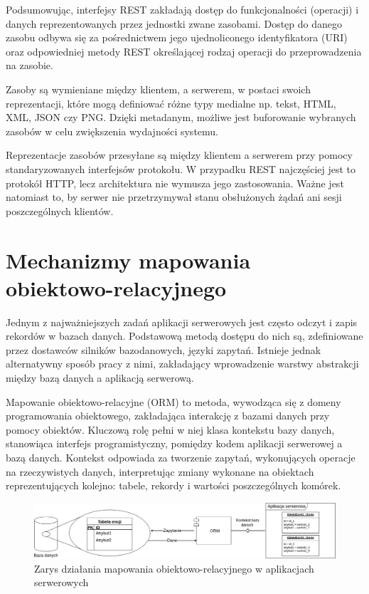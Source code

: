 Podsumowując, interfejsy REST zakładają dostęp do funkcjonalności (operacji) i danych reprezentowanych przez jednostki zwane zasobami. Dostęp do danego zasobu odbywa się za pośrednictwem jego  ujednoliconego identyfikatora (URI) oraz odpowiedniej metody REST określającej rodzaj operacji do przeprowadzenia na zasobie.

Zasoby są wymieniane między klientem, a serwerem, w postaci swoich reprezentacji, które mogą definiować różne typy medialne np. tekst, HTML, XML, JSON czy PNG. Dzięki metadanym, możliwe jest buforowanie wybranych zasobów w celu zwiększenia wydajności systemu.

Reprezentacje zasobów przesyłane są między klientem a serwerem przy pomocy standaryzowanych interfejsów protokołu. W przypadku REST najczęściej jest to protokół HTTP, lecz architektura nie wymusza jego zastosowania. Ważne jest natomiast to, by serwer nie przetrzymywał stanu obsłużonych żądań ani sesji poszczególnych klientów.

\section{Mechanizmy mapowania obiektowo-relacyjnego}

Jednym z najważniejszych zadań aplikacji serwerowych jest często odczyt i zapis rekordów w bazach danych. Podstawową metodą dostępu do nich są, zdefiniowane przez dostawców silników bazodanowych, języki zapytań. Istnieje jednak alternatywny sposób pracy z nimi, zakładający wprowadzenie warstwy abstrakcji między bazą danych a aplikacją serwerową. 

Mapowanie obiektowo-relacyjne (ORM) to metoda, wywodząca się z domeny programowania obiektowego, zakładająca interakcję z bazami danych przy pomocy obiektów. Kluczową rolę pełni w niej klasa kontekstu bazy danych, stanowiąca interfejs programistyczny, pomiędzy kodem aplikacji serwerowej a bazą danych. Kontekst odpowiada za tworzenie zapytań, wykonujących operacje na rzeczywistych danych, interpretując zmiany wykonane na obiektach reprezentujących kolejno: tabele, rekordy i wartości poszczególnych komórek.

\begin{figure}[!htbp] 
    \centering
    \includegraphics[width=\textwidth]{img/chapter3/orm.context.png}
    \caption{Zarys działania mapowania obiektowo-relacyjnego w aplikacjach serwerowych}
    \label{fig:orm.context}
\end{figure}

